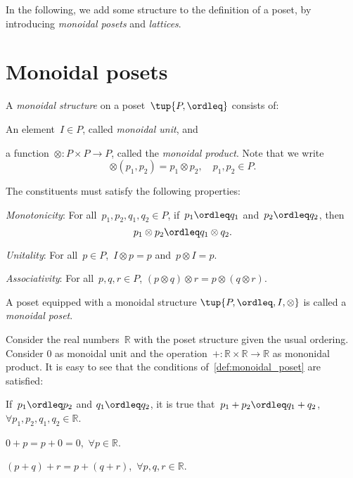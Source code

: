In the following, we add some structure to the definition of a poset, by introducing \emph{monoidal posets} and \emph{lattices}.
\section{Monoidal posets}

\begin{definition}
\label{def:monoidal_poset}
A \emph{monoidal structure} on a poset~$\tup{P,\ordleq}$ consists of:
\begin{compactenum}
    \item An element~$I\in P$, called \emph{monoidal unit}, and
    \item a function~$\otimes\colon P\times P\to P$, called the \emph{monoidal product}. Note that we write
    \begin{equation}
        \otimes(p_1,p_2)=p_1\otimes p_2, \quad p_1,p_2\in P.
    \end{equation}
\end{compactenum}
The constituents must satisfy the following properties:
\begin{compactenum}[(a)]
    \item \emph{Monotonicity}: For all~$p_1,p_2,q_1,q_2\in P$, if~$p_1\ordleq q_1$ and~$p_2\ordleq q_2$, then
    \begin{equation*}
    p_1\otimes p_2\ordleq q_1\otimes q_2.
    \end{equation*}
    \item \emph{Unitality}: For all~$p\in P$,~$I\otimes p=p$ and~$p\otimes I=p$.
    \item \emph{Associativity}: For all~$p,q,r\in P$, $(p\otimes q)\otimes r=p\otimes (q\otimes r)$.
\end{compactenum}
A poset equipped with a monoidal structure $\tup{P,\ordleq,I,\otimes}$ is called a \emph{monoidal poset}.
\end{definition}

\begin{example}
\label{ex:monoidal_pos_reals}
Consider the real numbers~$\mathbb{R}$ with the poset structure given the usual ordering. Consider 0 as monoidal unit and the operation~$+\colon \mathbb{R}\times \mathbb{R}\to \mathbb{R}$ as mononidal product. It is easy to see that the conditions of~\cref{def:monoidal_poset} are satisfied:
\begin{compactenum}[(a)]
    \item If~$p_1\ordleq p_2$ and $q_1\ordleq q_2$, it is true that~$p_1+p_2\ordleq q_1+q_2$,~$\forall p_1,p_2,q_1,q_2\in \mathbb{R}$.
    \item $0+p=p+0=0$,~$\forall p\in \mathbb{R}$.
    \item $(p+q)+r=p+(q+r)$,~$\forall p,q,r\in \mathbb{R}$.
\end{compactenum}
\end{example}

